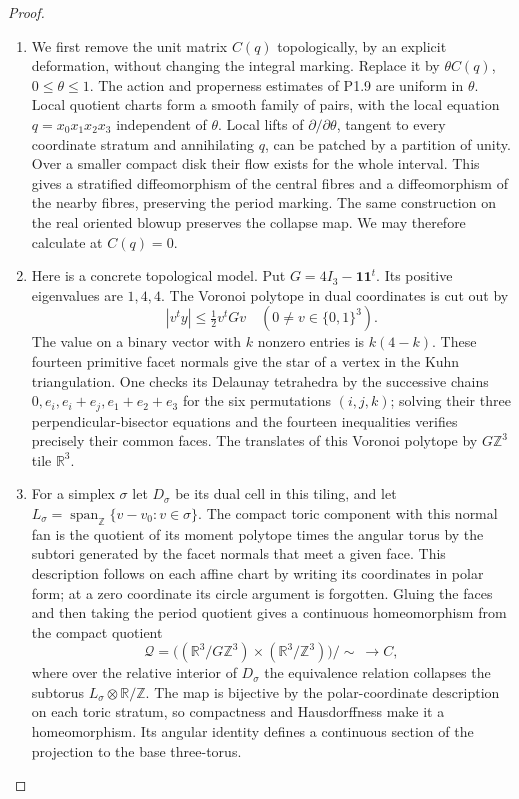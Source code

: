 \documentclass[11pt,a4paper]{article}
\theoremstyle{definition}
\begin{document}
\begin{proof}
\begin{enumerate}[label=\arabic*.]
\item We first remove the unit matrix $C(q)$ topologically, by an explicit
deformation, without changing the integral marking.  Replace it by
$\theta C(q)$, $0\leq\theta\leq1$.  The action and properness estimates
of P1.9 are uniform in $\theta$.  Local quotient charts form a smooth
family of pairs, with the local equation $q=x_0x_1x_2x_3$ independent
of $\theta$.  Local lifts of $\partial/\partial\theta$, tangent to every
coordinate stratum and annihilating $q$, can be patched by a partition
of unity.  Over a smaller compact disk their flow exists for the whole
interval.  This gives a stratified diffeomorphism of the central
fibres and a diffeomorphism of the nearby fibres, preserving the
period marking.  The same construction on the real oriented blowup
preserves the collapse map.  We may therefore calculate at $C(q)=0$.

\item Here is a concrete topological model.  Put $G=4I_3-\mathbf1\mathbf1^t$.
Its positive eigenvalues are $1,4,4$.  The Voronoi polytope in dual
coordinates is cut out by
\[
|v^ty|\leq \tfrac12v^tGv
 \quad (0\ne v\in\{0,1\}^3).
\]
The value on a binary vector with $k$ nonzero entries is $k(4-k)$.
These fourteen primitive facet normals give the star of a vertex in
the Kuhn triangulation.  One checks its Delaunay tetrahedra by the
successive chains
$0,e_i,e_i+e_j,e_1+e_2+e_3$ for the six permutations $(i,j,k)$;
solving their three perpendicular-bisector equations and the fourteen
inequalities verifies precisely their common faces.  The translates
of this Voronoi polytope by $G\mathbb Z^3$ tile $\mathbb R^3$.

\item For a simplex $\sigma$ let $D_\sigma$ be its dual cell in this tiling,
and let
$L_\sigma=\operatorname{span}_{\mathbb Z}\{v-v_0:v\in\sigma\}$.
The compact toric component with this normal fan is the quotient of
its moment polytope times the angular torus by the subtori generated
by the facet normals that meet a given face.  This description follows
on each affine chart by writing its coordinates in polar form;
at a zero coordinate its circle argument is forgotten.  Gluing the
faces and then taking the period quotient gives a continuous
homeomorphism from the compact quotient
\[
\mathcal Q=
\bigl((\mathbb R^3/G\mathbb Z^3)\times
       (\mathbb R^3/\mathbb Z^3)\bigr)/\!\sim\ \longrightarrow C,
\]
where over the relative interior of $D_\sigma$ the equivalence
relation collapses the subtorus $L_\sigma\otimes\mathbb R/\mathbb Z$.
The map is bijective by the polar-coordinate description on each
toric stratum, so compactness and Hausdorffness make it a homeomorphism.
Its angular identity defines a continuous section of the projection to
the base three-torus.


\end{enumerate}
\end{proof}
\end{document}
